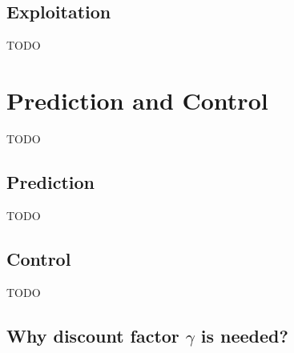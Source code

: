 \subsection{Exploitation}\label{subsec:exploitation}
TODO


\section{Prediction and Control}\label{sec:prediction-vs.-control}
TODO

\subsection{Prediction}\label{subsec:prediction}
TODO

\subsection{Control}\label{subsec:control}
TODO

\subsection{Why discount factor $\gamma$ is needed?}
%
%
%


